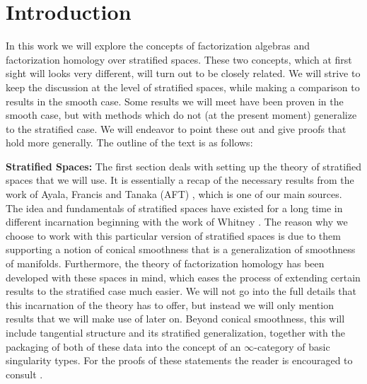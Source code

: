 \documentclass[../text.tex]{subfiles}
\begin{document}
\section{Introduction}

In this work we will explore the concepts of factorization algebras and factorization homology over stratified spaces. These two concepts, which at first sight will looks very different, will turn out to be closely related. We will strive to keep the discussion at the level of stratified spaces, while making a comparison to results in the smooth case. Some results we will meet have been proven in the smooth case, but with methods which do not (at the present moment) generalize to the stratified case. We will endeavor to point these out and give proofs that hold more generally. The outline of the text is as follows:

\textbf{ Stratified Spaces:} The first section deals with setting up the theory of stratified spaces that we will use. It is essentially a recap of the necessary results from the work of Ayala, Francis and Tanaka (AFT) \cite{aft_localstrut}, which is one of our main sources. The idea and fundamentals of stratified spaces have existed for a long time in different incarnation beginning with the work of Whitney \cite{whitney92}. The reason why we choose to work with this particular version of stratified spaces is due to them supporting a notion of conical smoothness that is a generalization of smoothness of manifolds. Furthermore, the theory of factorization homology has been developed with these spaces in mind, which eases the process of extending certain results to the stratified case much easier. We will not go into the full details that this incarnation of the theory has to offer, but instead we will only mention results that we will make use of later on. Beyond conical smoothness, this will include tangential structure and its stratified generalization, together with the packaging of both of these data into the concept of an $\infty$-category of basic singularity types. For the proofs of these statements the reader is encouraged to consult \cite{aft_localstrut}.
\end{document}
